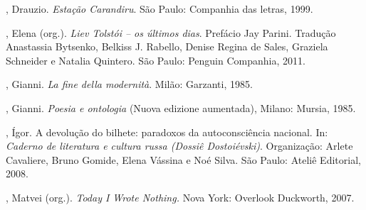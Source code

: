 , Drauzio. \emph{Estação Carandiru}. São Paulo: Companhia das letras, 1999.

, Elena (org.). \emph{Liev Tolstói -- os últimos dias}. Prefácio Jay Parini. Tradução
Anastassia Bytsenko, Belkiss J. Rabello, Denise Regina de Sales, Graziela Schneider e Natalia Quintero. São Paulo:
Penguin Companhia, 2011.

, Gianni. \emph{La fine della modernità}. Milão: Garzanti, 1985.

, Gianni. \emph{Poesia e ontologia} (Nuova edizione aumentada),
Milano: Mursia, 1985.

, Ígor. A devolução do bilhete: paradoxos da
autoconsciência nacional. In: \emph{Caderno de literatura e cultura russa (Dossiê Dostoiévski)}. Organização: Arlete Cavaliere, Bruno Gomide, Elena Vássina e Noé Silva. São Paulo: Ateliê Editorial, 2008.

, Matvei (org.). \emph{Today I Wrote Nothing.} Nova York:
Overlook Duckworth, 2007.

\afterpage{\blankpage}